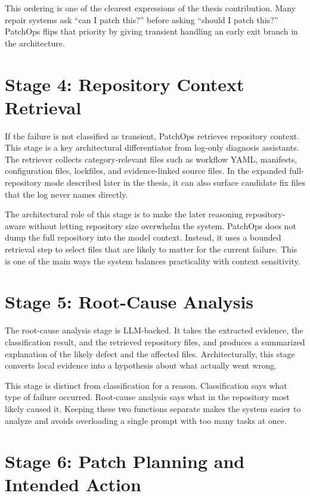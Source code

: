 This ordering is one of the clearest expressions of the thesis contribution. Many repair systems ask ``can I
patch this?'' before asking ``should I patch this?'' PatchOps flips that priority by giving transient handling an
early exit branch in the architecture.

\section{Stage 4: Repository Context Retrieval}

If the failure is not classified as transient, PatchOps retrieves repository context. This stage is a key
architectural differentiator from log-only diagnosis assistants. The retriever collects category-relevant files
such as workflow YAML, manifests, configuration files, lockfiles, and evidence-linked source files. In the
expanded full-repository mode described later in the thesis, it can also surface candidate fix files that the
log never names directly.

The architectural role of this stage is to make the later reasoning repository-aware without letting repository
size overwhelm the system. PatchOps does not dump the full repository into the model context. Instead, it uses a
bounded retrieval step to select files that are likely to matter for the current failure. This is one of the
main ways the system balances practicality with context sensitivity.

\section{Stage 5: Root-Cause Analysis}

The root-cause analysis stage is LLM-backed. It takes the extracted evidence, the classification result, and the
retrieved repository files, and produces a summarized explanation of the likely defect and the affected files.
Architecturally, this stage converts local evidence into a hypothesis about what actually went wrong.

This stage is distinct from classification for a reason. Classification says what type of failure occurred.
Root-cause analysis says what in the repository most likely caused it. Keeping these two functions separate
makes the system easier to analyze and avoids overloading a single prompt with too many tasks at once.

\section{Stage 6: Patch Planning and Intended Action}

